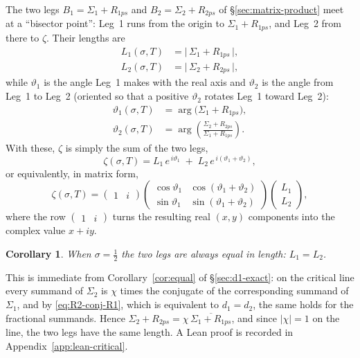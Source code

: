 \documentclass[11pt]{article}
\newtheorem{corollary}[theorem]{Corollary}
\theoremstyle{definition}
\begin{document}
The two legs $B_1=\Sigma_1+R_{1ps}$ and $B_2=\Sigma_2+R_{2ps}$ of
\S\ref{sec:matrix-product} meet at a ``bisector point'': Leg~1 runs from the
origin to $\Sigma_1+R_{1ps}$, and Leg~2 from there to $\zeta$. Their lengths are
\begin{align}
L_{1}(\sigma,T) &= \bigl|\,\Sigma_{1}+R_{1ps}\,\bigr|,\\
L_{2}(\sigma,T) &= \bigl|\,\Sigma_{2}+R_{2ps}\,\bigr|,
\end{align}
while $\vartheta_1$ is the angle Leg~1 makes with the real axis and $\vartheta_2$
is the angle from Leg~1 to Leg~2 (oriented so that a positive $\vartheta_2$
rotates Leg~1 toward Leg~2):
\begin{align}
\vartheta_{1}(\sigma,T) &= \arg\!\bigl(\Sigma_{1}+R_{1ps}\bigr),\\[2pt]
\vartheta_{2}(\sigma,T) &= \arg\!\left(\frac{\Sigma_{2}+R_{2ps}}{\Sigma_{1}+R_{1ps}}\right).
\end{align}
With these, $\zeta$ is simply the sum of the two legs,
\begin{equation}\label{eq:zeta-legs-polar}
\zeta(\sigma,T)
= L_{1}\,e^{\,i\vartheta_{1}}
\;+\;
L_{2}\,e^{\,i(\vartheta_{1}+\vartheta_{2})},
\end{equation}
or equivalently, in matrix form,
\begin{equation}\label{eq:zeta-matrix}
\zeta(\sigma,T)
=
\begin{pmatrix}1 & i\end{pmatrix}
\begin{pmatrix}
\cos\vartheta_{1} & \cos(\vartheta_{1}+\vartheta_{2})\\[2pt]
\sin\vartheta_{1} & \sin(\vartheta_{1}+\vartheta_{2})
\end{pmatrix}
\begin{pmatrix}
L_{1}\\[2pt]
L_{2}
\end{pmatrix},
\end{equation}
where the row $\begin{pmatrix}1 & i\end{pmatrix}$ turns the resulting real
$(x,y)$ components into the complex value $x+iy$.

\begin{corollary}\label{cor:equal-legs}
When $\sigma=\tfrac12$ the two legs are always equal in length: $L_1=L_2$.
\end{corollary}

This is immediate from Corollary~\ref{cor:equal} of \S\ref{sec:d1-exact}:
on the critical line every summand of $\Sigma_2$ is $\chi$ times the
conjugate of the corresponding summand of $\Sigma_1$, and by
\eqref{eq:R2-conj-R1}, which is equivalent to $d_1=d_2$, the same holds for the
fractional summands. Hence
$\Sigma_2+R_{2ps} = \chi\,\overline{\Sigma_1+R_{1ps}}$, and since $|\chi|=1$
on the line, the two legs have the same length. A Lean proof is recorded in
Appendix~\ref{app:lean-critical}.
\end{document}
